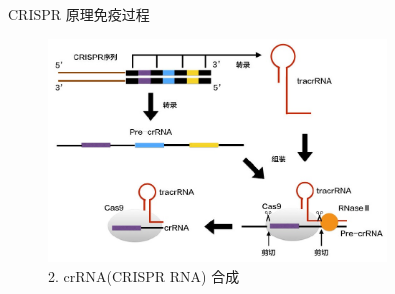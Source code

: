 \documentclass{beamer}
\begin{document}
\begin{frame}{CRISPR 原理}{免疫过程}
		
	\begin{figure}
		\centering
		\includegraphics[width=0.8\textwidth]{img/infect_stage2.jpeg}
		\caption{2. crRNA(CRISPR RNA) 合成}
	\end{figure}








\end{frame}

\end{document}
